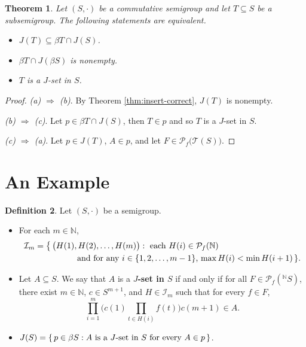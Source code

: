 \documentclass[12pt]{article}
\theoremstyle{plain}
\newtheorem{thm}{Theorem}[section]
\theoremstyle{definition}
\newtheorem{defn}[thm]{Definition}
\newcommand{\calT}{\mathcal{T}}
\newcommand{\Pf}{\mathcal{P}_f}
\begin{document}
\begin{thm}
  Let $(S, \cdot)$ be a commutative semigroup and let $T \subseteq S$ be a  subsemigroup. 
  The following statements are equivalent.
  \begin{itemize}
    \item[(a)] $J(T) \subseteq \beta T \cap J(S)$.
    \item[(b)] $\beta T \cap J(\beta S)$ is nonempty.
    \item[(c)] $T$ is a $J$-set in $S$.
  \end{itemize}
\end{thm}
\begin{proof}
  \textsl{(a) $\Rightarrow$ (b)}.
  By Theorem \ref{thm:insert-correct}, $J(T)$ is nonempty.

  \textsl{(b) $\Rightarrow$ (c)}.
  Let $p \in \beta T \cap J(S)$, then $T \in p$ and so $T$ is a $J$-set in $S$. 
  
  \textsl{(c) $\Rightarrow$ (a)}.
  Let $p \in J(T)$, $A \in p$, and let $F \in \Pf\bigl(\calT(S) \bigr)$. 
  
\end{proof}


\section{An Example}
 \begin{defn}
  Let $(S,\cdot)$ be a semigroup.
    \begin{itemize}
    \item[(a)] For each $m \in \mathbb{N}$,
      \begin{align*}
      \mathcal{I}_m = \bigl\{\,\bigl(H(1) &, H(2), \ldots, 
      H(m)\bigr) : \hbox{ each $H(i) \in 
      \mathcal{P}_f(\mathbb{N})$} \\ 
      & \hbox{ and for any $i \in \{1, 2,\ldots, m-1\}$, 
      $\max H(i) < \min H(i+1)$} \,\}.
      \end{align*}

    \item[(b)] Let $A \subseteq S$.
      We say that $A$ is a \textbf{$J$-set in $S$} if and only if
      for all $F \in \mathcal{P}_f(^{\mathbb{N}}{\!S})$, there exist
      $m \in \mathbb{N}$, $c \in S^{m+1}$, and $H \in \mathcal{I}_m$
      such that for every $f \in F$,
      \[
      \prod_{i=1}^m\bigl(c(1) \prod_{t \in H(i)} f(t)\bigr)c(m+1) \in
      A.
      \]

    \item[(c)] $J(S) = \{\, p \in \beta S : \hbox{$A$ is a 
      $J$-set in $S$ for every $A \in p$} \,\}$.
    \end{itemize}
  \end{defn}
\end{document}
